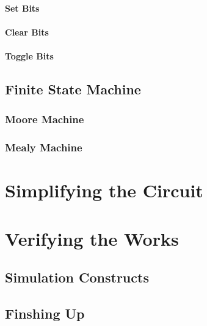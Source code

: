 \documentclass[a4paper,11pt]{book}
\begin{document}
\subsection{Set Bits}
\subsection{Clear Bits}
\subsection{Toggle Bits}

\chapter{Finite State Machine}
\section{Moore Machine}
\section{Mealy Machine}

\part{Simplifying the Circuit}

\part{Verifying the Works}

\chapter{Simulation Constructs}
\chapter{Finshing Up}

\backmatter
% 
\end{document}
